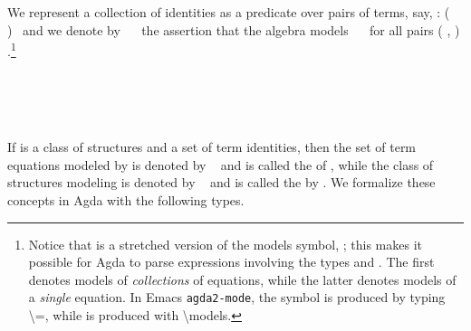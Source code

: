 We represent a collection of identities as a predicate over pairs of
terms, say,  : (    )~\au{}  and we denote by
~~ the assertion that the algebra  models ~~
for all pairs ( , )  .\footnote{Notice that  is
a stretched version of the models symbol, ; this makes it possible for Agda to
parse expressions involving the types  and .
\ifshort\else
The first denotes
models of \emph{collections} of equations, while the latter denotes models of a
\emph{single} equation.
\fi
In Emacs \texttt{agda2-mode}, the symbol  is produced by typing
\textbackslash\textbar{}=, while  is
produced with \textbackslash{}models.}

\begin{code}%
\>[0]\<%
\\
\>[0][@{}l@{\AgdaIndent{1}}]%
\>[1]\AgdaSpace{}%
\AgdaSymbol{:}\AgdaSpace{}%
\AgdaSymbol{(}\AgdaSpace{}%
\AgdaSymbol{:}\AgdaSpace{}%
\AgdaSpace{}%
\AgdaSpace{}%
\AgdaSymbol{)}\AgdaSpace{}%
\AgdaSpace{}%
\AgdaSymbol{(}\AgdaSpace{}%
\AgdaSpace{}%
\AgdaSpace{}%
\AgdaSpace{}%
\AgdaSymbol{)(}\AgdaSpace{}%
\AgdaSymbol{)}\AgdaSpace{}%
\AgdaSpace{}%
\AgdaSpace{}%
\AgdaSymbol{\AgdaUnderscore{}}\<%
\\
%
\>[1]\AgdaSpace{}%
\AgdaSpace{}%
\AgdaSpace{}%
\AgdaSymbol{=}\AgdaSpace{}%
\AgdaSpace{}%
\AgdaSymbol{\{}\AgdaSpace{}%
\AgdaSymbol{\}}\AgdaSpace{}%
\AgdaSpace{}%
\AgdaSymbol{(}\AgdaSpace{}%
\AgdaOperator{\AgdaInductiveConstructor{,}}\AgdaSpace{}%
\AgdaSymbol{)}\AgdaSpace{}%
\AgdaSpace{}%
\AgdaSpace{}%
\AgdaSpace{}%
\AgdaSpace{}%
\AgdaSpace{}%
\AgdaSpace{}%
\AgdaSpace{}%
\AgdaSpace{}%
\AgdaSpace{}%
\<%
\\
\>[0]\<%
\end{code}

If  is a class of structures and  a set of term identities, then the set of
term equations modeled by  is denoted by ~ and is called the
 of , while the class of structures modeling  is
denoted by ~ and is called the  by
. We formalize these concepts in Agda with the following types.

